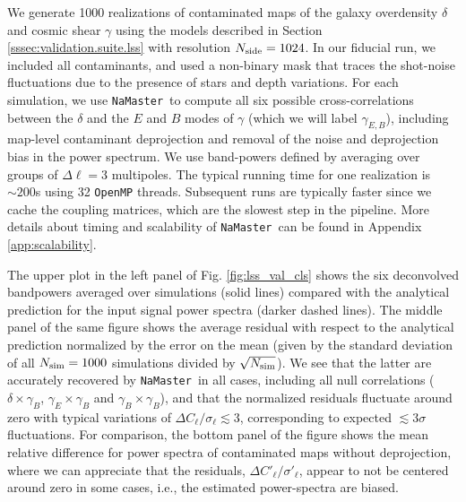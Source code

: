 \documentclass[usenatbib]{mnrasb}
\newcommand{\nmt}{{\tt NaMaster}}
\begin{document}
      We generate 1000 realizations of contaminated maps of the galaxy overdensity $\delta$ and cosmic shear $\gamma$ using the models described in Section \ref{sssec:validation.suite.lss} with resolution $N_{\rm side}=1024$. In our fiducial run, we included all contaminants, and used a non-binary mask that traces the shot-noise fluctuations due to the presence of stars and depth variations. For each simulation, we use \nmt~to compute all six possible cross-correlations between the $\delta$ and the $E$ and $B$ modes of $\gamma$ (which we will label $\gamma_{E,B}$), including map-level contaminant deprojection and removal of the noise and deprojection bias in the power spectrum. We use band-powers defined by averaging over groups of $\Delta\ell=3$ multipoles. The typical running time for one realization is $\sim 200$s using 32 \texttt{OpenMP} threads. Subsequent runs are typically faster since we cache the coupling matrices, which are the slowest step in the pipeline. More details about timing and scalability of \nmt~can be found in Appendix \ref{app:scalability}.
      
      The upper plot in the left panel of Fig. \ref{fig:lss_val_cls} shows the six deconvolved bandpowers averaged over simulations (solid lines) compared with the analytical prediction for the input signal power spectra (darker dashed lines). The middle panel of the same figure shows the average residual with respect to the analytical prediction normalized by the error on the mean (given by the standard deviation of all $N_{\rm sim}=1000$ simulations divided by $\sqrt{N_{\rm sim}}$). We see that the latter are accurately recovered by \nmt~in all cases, including all null correlations ($\delta\times\gamma_B$, $\gamma_E\times\gamma_B$ and $\gamma_B\times\gamma_B$), and that the normalized residuals fluctuate around zero with typical variations of $\Delta C_\ell/\sigma_\ell\lesssim3$, corresponding to expected $\lesssim3\sigma$ fluctuations. For comparison, the bottom panel of the figure shows the mean relative difference for power spectra of contaminated maps without deprojection, where we can appreciate that the residuals, $\Delta C'_{\ell}/\sigma'_{\ell}$, appear to not be centered around zero in some cases, i.e., the estimated power-spectra are biased.
      
\end{document}
